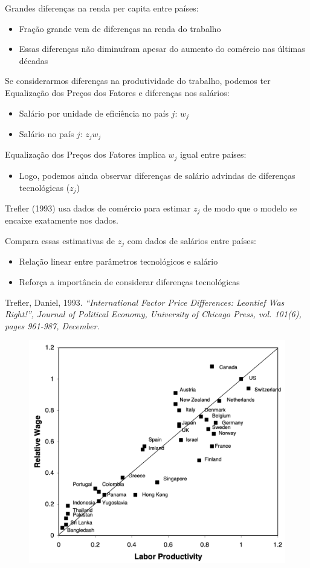 \documentclass[a4paper,12pt]{article}[abntex2]
\begin{document}
Grandes diferenças na renda per capita entre países:
\begin{itemize}
    \item Fração grande vem de diferenças na renda do trabalho
    \item Essas diferenças não diminuíram apesar do aumento do comércio nas últimas décadas
\end{itemize}

Se considerarmos diferenças na produtividade do trabalho, podemos ter Equalização dos Preços dos Fatores e diferenças nos salários:
\begin{itemize}
    \item Salário por unidade de eficiência no país $j$: $w_j$
    \item Salário no país $j$: $z_j w_j$
\end{itemize}

Equalização dos Preços dos Fatores implica $w_j$ igual entre países:
\begin{itemize}
    \item Logo, podemos ainda observar diferenças de salário advindas de diferenças tecnológicas ($z_j$)
\end{itemize}

Trefler (1993) usa dados de comércio para estimar $z_j$ de modo que o modelo se encaixe exatamente nos dados.

Compara essas estimativas de $z_j$ com dados de salários entre países:
\begin{itemize}
    \item Relação linear entre parâmetros tecnológicos e salário
    \item Reforça a importância de considerar diferenças tecnológicas
\end{itemize}

Trefler, Daniel, 1993. \textit{“International Factor Price Differences: Leontief Was Right!”, Journal of Political Economy, University of Chicago Press, vol. 101(6), pages 961-987, December.}

\begin{figure}[H]
    \centering
    \includegraphics[width=0.7\linewidth]{Imagens/a13i2.png}
\end{figure}
\end{document}
